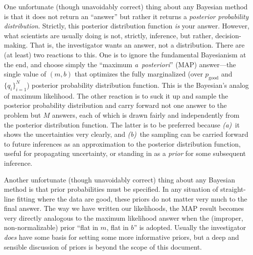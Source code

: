 \documentclass[12pt]{article}
\newcommand{\notenglish}[1]{\textit{#1}}
\newcommand{\aposteriori}{\notenglish{a~posteriori}}
\newcounter{problem}
\newcommand{\setofall}[3]{\{{#1}\}_{{#2}}^{{#3}}}
\newcommand{\allq}{\setofall{q_i}{i=1}{N}}
\newcommand{\pgood}{p_{\mathrm{good}}}
\begin{document}
One unfortunate (though unavoidably correct) thing about any Bayesian
method is that it does not return an ``answer'' but rather it returns
a \emph{posterior probability distribution}.  Strictly, this posterior
distribution function \emph{is} your answer.  However, what scientists
are usually doing is not, strictly, inference, but rather,
decision-making.  That is, the investigator wants an answer, not a
distribution.  There are (at least) two reactions to this.  One is to
ignore the fundamental Bayesianism at the end, and choose simply the
``maximum \aposteriori'' (MAP) answer---the single value of $(m,b)$
that optimizes the fully marginalized (over $\pgood$ and $\allq$)
posterior probability distribution function.  This is the Bayesian's
analog of maximum likelihood.  The other reaction is to suck it up and
sample the posterior probability distribution and carry forward not
one answer to the problem but $M$ answers, each of which is drawn
fairly and independently from the posterior distribution function.
The latter is to be preferred because \textsl{(a)}~it shows the
uncertainties very clearly, and \textsl{(b)}~the sampling can be
carried forward to future inferences as an approximation to the
posterior distribution function, useful for propagating uncertainty,
or standing in as a \emph{prior} for some subsequent inference.

Another unfortunate (though unavoidably correct) thing about any
Bayesian method is that prior probabilities must be specified.  In any
situation of straight-line fitting where the data are good, these
priors do not matter very much to the final answer.  The way we have
written our likelihoods, the MAP result becomes very directly
analogous to the maximum likelihood answer when the (improper,
non-normalizable) prior ``flat in $m$, flat in $b$'' is adopted.
Usually the investigator \emph{does} have some basis for setting some
more informative priors, but a deep and sensible discussion of priors
is beyond the scope of this document.
\end{document}
